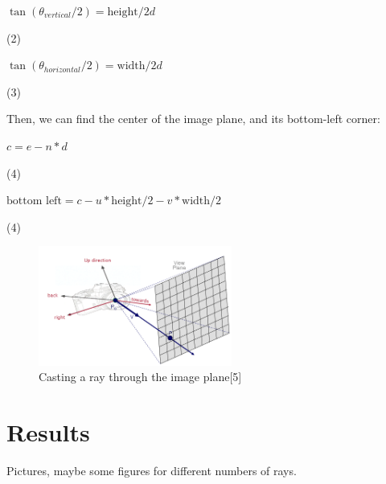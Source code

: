\documentclass[journal]{IEEEtran}
\begin{document}
\begin{center}
$\tan(\theta_{vertical}/2) = \text{height} / 2d$
\end{center}

\begin{flushright}
\par 
(2)
\end{flushright}

\begin{center}
$\tan(\theta_{horizontal}/2) = \text{width} / 2d$
\end{center}

\begin{flushright}
\par 
(3)
\end{flushright}

Then, we can find the center of the image plane, and its bottom-left corner:

\begin{center}
$c = e - n * d$
\end{center}

\begin{flushright}
\par 
(4)
\end{flushright}

\begin{center}
$\text{bottom left} = c - u * \text{height} /2 - v * \text{width} /2$
\end{center}

\begin{flushright}
\par 
(4)
\end{flushright}

\begin{figure}[!t]

\centering
\includegraphics[width=2.5in]{raycast_viewplane}
\caption{Casting a ray through the image plane[5]}
\label{raycast_imageplane}

\end{figure}

\section{Results}
Pictures, maybe some figures for different numbers of rays.
\end{document}
